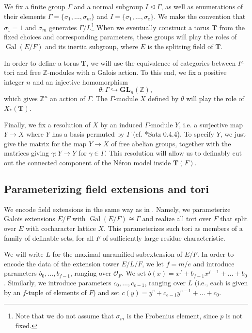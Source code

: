 \documentclass{amsart}
\newcommand{\Z}{{\mathbb Z}}
\newcommand{\ri}{\mathcal{O}}
\DeclareMathOperator{\gal}{Gal}
\newcommand{\GL}{\mathbf {GL}}
\newcommand{\bT}{\mathbf {T}}
\theoremstyle{plain}
\theoremstyle{definition}
\begin{document}
We fix a finite group $\Gamma$ and a normal subgroup $I \unlhd \Gamma$,
as well as enumerations of their elements $\Gamma = \{\sigma_1, \dots, \sigma_m\}$ and
$I = \{\sigma_1, \dots, \sigma_e\}$.  We make the convention that $\sigma_1 = 1$ and $\sigma_m$
generates $\Gamma / I$.\footnote{Note that we do not assume that $\sigma_m$ is the Frobenius element, since $p$ is not fixed.}
When we eventually construct a torus $\bT$ from the fixed choices
and corresponding parameters, these groups will play the roles of $\gal(E/F)$
and its inertia subgroup, where $E$ is the splitting field of $\bT$.

In order to define a torus $\bT$, we will use the equivalence of categories between $F$-tori and
free $\Z$-modules with a Galois action.  To this end, we fix a positive integer $n$ and an injective homomorphism
\begin{equation} \label{eq:theta}
\theta : \Gamma \hookrightarrow \GL_n(\Z),
\end{equation}
which gives $\Z^n$ an action of $\Gamma$.  The $\Gamma$-module $X$ defined by $\theta$ will play the role of $X_\ast(\bT)$.

Finally, we fix a resolution of $X$ by an induced $\Gamma$-module $Y$, i.e. a surjective map
$Y \to X$ where $Y$ has a basis permuted by $\Gamma$ (cf. \cite{brahm:thesis}*{Satz 0.4.4}).
To specify $Y$, we just give the matrix for the map $Y \to X$ of free abelian groups,
together with the matrices giving $\gamma : Y \to Y$ for $\gamma \in \Gamma$.
This resolution will allow us to definably cut out the connected component of the N\'eron model inside $\bT(F)$.

\subsection{Parameterizing field extensions and tori}\label{sub:def_tori}
 
We encode field extensions in the same way as in \cite{cluckers-gordon-halupczok:14b}.
Namely, we parameterize Galois extensions $E/F$ with $\gal(E/F) \cong \Gamma$
and realize all tori over $F$ that split over $E$ with cocharacter lattice $X$.
This parameterizes such tori as members of a family of definable sets,
for all $F$ of sufficiently large residue characteristic. 

We will write $L$ for the maximal unramified subextension of $E/F$.  In order to encode the data of the extension tower $E/L/F$,
we let $f=m/e$ and introduce parameters $b_0,\dots, b_{f-1}$, ranging over $\ri_F$.
We set $b(x)=x^f+b_{f-1}x^{f-1}+ \dots + b_0$. 
Similarly, we introduce parameters $c_0, \dots, c_{e-1}$, ranging over $L$
(i.e., each is given by an $f$-tuple of elements of $F$) and set $c(y) = y^e + c_{e-1}y^{e-1} + \dots + c_0$.
\end{document}
